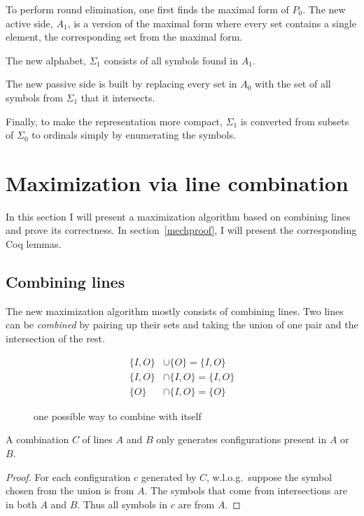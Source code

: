 \documentclass[english, 12pt, a4paper, sci, a-1b, online]{aaltothesis}
\begin{document}
To perform round elimination, one first finds the maximal form of $P_0$. The new active side, $A_1$, is a version of the maximal form where every set contains a single element, the corresponding set from the maximal form.

The new alphabet, $\Sigma_1$ consists of all symbols found in $A_1$.

The new passive side is built by replacing every set in $A_0$ with the set of all symbols from $\Sigma_1$ that it intersects.

Finally, to make the representation more compact, $\Sigma_1$ is converted from subsets of $\Sigma_0$ to ordinals simply by enumerating the symbols.


\section{Maximization via line combination}\label{nlproof}

In this section I will present a maximization algorithm based on combining lines and prove its correctness. In section~\ref{mechproof}, I will present the corresponding Coq lemmas.

\subsection{Combining lines}

The new maximization algorithm mostly consists of combining lines. Two lines can be \emph{combined} by pairing up their sets and taking the union of one pair and the intersection of the rest.

\begin{figure}[h]
\begin{align*}
  \{I,O\} &\cup \{O\} = \{I, O\} \\
  \{I,O\} &\cap \{I,O\} = \{I, O\} \\
  \{O\} &\cap \{I, O\} = \{O\}
\end{align*}
\caption{one possible way to combine  with itself}
\end{figure}

\begin{theorem}
\label{sound}
A combination $C$ of lines $A$ and $B$ only generates configurations present in $A$ or $B$.
\end{theorem}

\begin{proof}
For each configuration $c$ generated by $C$, w.l.o.g.\ suppose the symbol chosen from the union is from $A$. The symbols that come from intersections are in both $A$ and $B$. Thus all symbols in $c$ are from $A$.
\end{proof}
\end{document}
